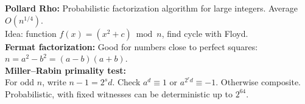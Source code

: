 \textbf{Pollard Rho:} Probabilistic factorization algorithm for large integers. Average $O(n^{1/4})$. \\[1mm]
Idea: function $f(x)=(x^2+c)\bmod n$, find cycle with Floyd. \\

\textbf{Fermat factorization:} Good for numbers close to perfect squares: $n=a^2-b^2=(a-b)(a+b)$. \\[1mm]

\textbf{Miller–Rabin primality test:} \\[1mm]
For odd $n$, write $n-1=2^s d$. Check $a^d\equiv1$ or $a^{2^r d}\equiv-1$. Otherwise composite. \\
Probabilistic, with fixed witnesses can be deterministic up to $2^{64}$. \\